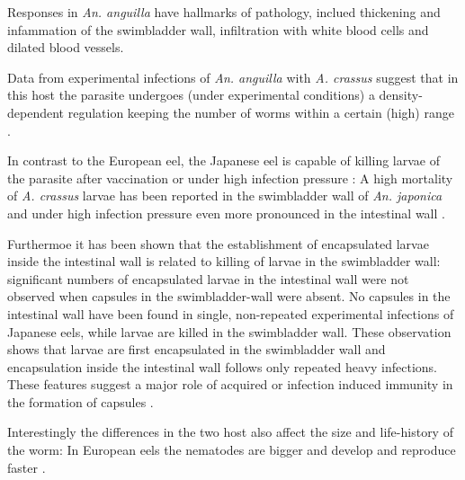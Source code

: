 Responses in \textit{An. anguilla} have hallmarks of pathology,
inclued thickening \cite{wurtz_tara_2000} and infammation
\cite{beregi_radiodiagnostic_1998} of the swimbladder wall,
infiltration with white blood cells and dilated blood vessels.

Data from experimental infections of \textit{An. anguilla} with
\textit{A. crassus} suggest that in this host the parasite undergoes
(under experimental conditions) a density-dependent regulation keeping
the number of worms within a certain (high) range
\cite{fazio_regulation_2008}.

In contrast to the European eel, the Japanese eel is capable of
killing larvae of the parasite after vaccination
\cite{knopf_vaccination_2008} or under high infection pressure
\cite{heitlinger_massive_2009}: A high mortality of
\textit{A. crassus} larvae has been reported in the swimbladder wall
of \textit{An. japonica} \cite{mnderle_occurrence_2006} and under high
infection pressure even more pronounced in the intestinal wall
\cite{heitlinger_massive_2009}.

Furthermoe it has been shown that the establishment of encapsulated
larvae inside the intestinal wall is related to killing of larvae in
the swimbladder wall: significant numbers of encapsulated larvae in
the intestinal wall were not observed when capsules in the
swimbladder-wall were absent. No capsules in the intestinal wall have
been found in single, non-repeated experimental infections of Japanese
eels, while larvae are killed in the swimbladder wall. These
observation shows that larvae are first encapsulated in the
swimbladder wall and encapsulation inside the intestinal wall follows
only repeated heavy infections. These features suggest a major role of
acquired or infection induced immunity in the formation of capsules
\cite{heitlinger_massive_2009}.

Interestingly the differences in the two host also affect the size and
life-history of the worm: In European eels the nematodes are bigger
and develop and reproduce faster \cite{knopf_differences_2004}.



